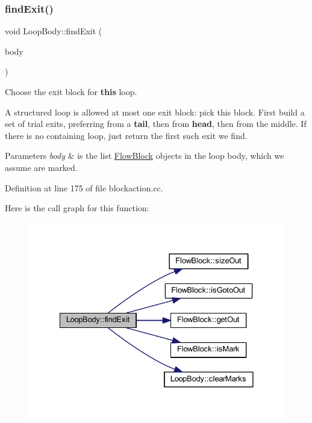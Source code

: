 \subsubsection{\texorpdfstring{findExit()}{findExit()}}
{\footnotesize\ttfamily void Loop\+Body\+::find\+Exit (\begin{DoxyParamCaption}\item[{const vector$<$ \mbox{\hyperlink{class_flow_block}{Flow\+Block}} $\ast$ $>$ \&}]{body }\end{DoxyParamCaption})}



Choose the exit block for {\bfseries{this}} loop. 

A structured loop is allowed at most one exit block\+: pick this block. First build a set of trial exits, preferring from a {\bfseries{tail}}, then from {\bfseries{head}}, then from the middle. If there is no containing loop, just return the first such exit we find. 
\begin{DoxyParams}{Parameters}
{\em body} & is the list \mbox{\hyperlink{class_flow_block}{Flow\+Block}} objects in the loop body, which we assume are marked. \\
\hline
\end{DoxyParams}


Definition at line 175 of file blockaction.\+cc.

Here is the call graph for this function\+:
\nopagebreak
\begin{figure}[H]
\begin{center}
\leavevmode
\includegraphics[width=328pt]{class_loop_body_a44aa946a133471f9ea5820fab49685f3_cgraph}
\end{center}
\end{figure}
\mbox{\label{class_loop_body_a5c34d8675c1290e7b3ad25d602f6d52e}} 

